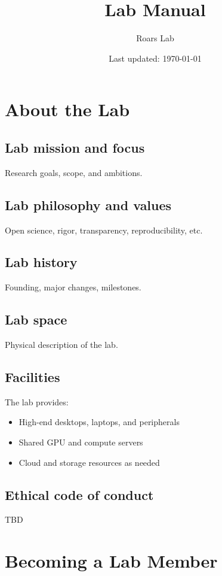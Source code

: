 \documentclass[11pt]{article}
\title{Lab Manual}
\author{Roars Lab}
\date{Last updated: \today}
\begin{document}
\maketitle
\tableofcontents
\newpage


\section{About the Lab}

\subsection{Lab mission and focus}
Research goals, scope, and ambitions.

\subsection{Lab philosophy and values}
Open science, rigor, transparency, reproducibility, etc.

\subsection{Lab history}
Founding, major changes, milestones.

\subsection{Lab space}
Physical description of the lab.


\subsection{Facilities}
The lab provides:
\begin{itemize}
  \item High-end desktops, laptops, and peripherals
  \item Shared GPU and compute servers
  \item Cloud and storage resources as needed
\end{itemize}

\subsection{Ethical code of conduct}

TBD

\section{Becoming a Lab Member}
\end{document}
